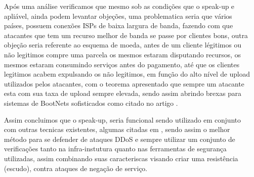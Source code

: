 \documentclass[a4paper,12pt]{article}
\begin{document}
 \vspace{0.3cm}
 
 
 Após uma análise verificamos que mesmo sob as condições que o speak-up e apliável, ainda podem levantar objeções, uma problematica seria que vários países, possuem conexões ISPs de baixa largura de banda, fazendo com que atacantes que tem um recurso melhor de banda se passe por clientes bons, outra objeção seria referente ao esquema de moeda, antes de um cliente légitimos ou não legitimos compre uma parcela os mesmos estaram disputando recursos, os mesmos estaram consumindo serviços antes do pagamento, até que os clientes legitimos acabem expulsando os não legitimos, em função do alto nível de upload utilizados pelos atacantes, com o teorema apresentado que sempre um atacante esta com sua taxa de upload sempre elevada, sendo assim abrindo brexas para sistemas de BootNets sofisticados como citado no artigo \cite{7160662}.

 Assim concluimos que o speak-up, seria funcional sendo utilizado em conjunto com outras tecnicas existentes, algumas citadas em \cite{7821722}, sendo assim  o melhor método para se defender de ataques DDoS e sempre utilizar um conjunto de verificações tanto na infra-instutura quanto nas ferramentas de segurança utilizadas, assim combinando suas caracteriscas visando criar uma resistência (escudo), contra ataques de negação de serviço.  
 
 
 
\vspace{2cm}


\begin{center}
\end{center}

 
\end{document}

